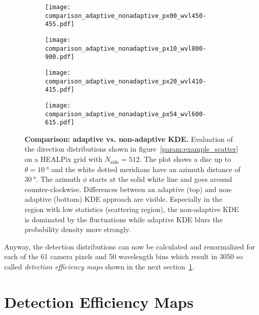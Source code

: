 \begin{figure}[H]
	\centering
	\begin{subfigure}[t]{0.49\textwidth}
		\texttt{[image: comparison\_adaptive\_nonadaptive\_px00\_wvl450-455.pdf]}
		\subcaption{}
		\label{param:kde_comparison:1}
	\end{subfigure}
	\hfill
	\begin{subfigure}[t]{0.49\textwidth}
		\texttt{[image: comparison\_adaptive\_nonadaptive\_px10\_wvl800-900.pdf]}
		\subcaption{}
		\label{param:kde_comparison:2}
	\end{subfigure}
\end{figure}
\begin{figure}[H]
	\ContinuedFloat
	\centering
	\begin{subfigure}[b]{0.49\textwidth}
		\texttt{[image: comparison\_adaptive\_nonadaptive\_px20\_wvl410-415.pdf]}
		\subcaption{}
		\label{param:kde_comparison:3}
	\end{subfigure}
	\hfill
	\begin{subfigure}[b]{0.49\textwidth}
		\texttt{[image: comparison\_adaptive\_nonadaptive\_px54\_wvl600-615.pdf]}
		\subcaption{}
		\label{param:kde_comparison:4}
	\end{subfigure}
	\caption[Comparison: adaptive vs. non-adaptive KDE]{\textbf{Comparison: adaptive vs. non-adaptive KDE.} Evaluation of the direction distributions shown in figure~\ref{param:example_scatter} on a HEALPix grid with $N_\text{side}=\num{512}$. The plot shows a disc up to $\theta=\SI{10}{\degree}$ and the white dotted meridians have an azimuth distance of $\SI{30}{\degree}$. The azimuth $\phi$ starts at the solid white line and goes around counter-clockwise. Differences between an adaptive (top) and non-adaptive (bottom) KDE approach are visible. Especially in the region with low statistics (scattering region), the non-adaptive KDE is dominated by the fluctuations while adaptive KDE blurs the probability density more strongly.}
	\label{param:kde_comparison}		
\end{figure}

Anyway, the detection distributions can now be calculated and renormalized for each of the \num{61} camera pixels and \num{50} wavelength bins which result in \num{3050} so called \textit{detection efficiency maps} shown in the next section~\ref{sec:deteff_maps}.
\newpage

\section{Detection Efficiency Maps}\label{sec:deteff_maps}

